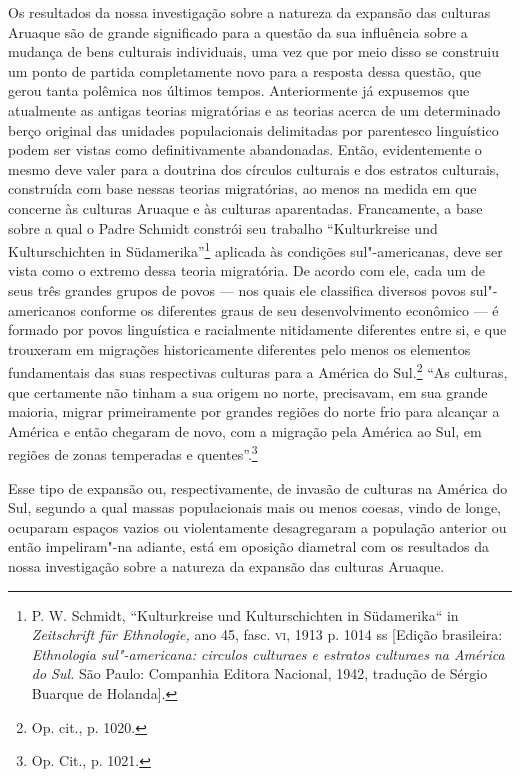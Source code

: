 Os resultados da nossa investigação sobre a natureza da expansão das
culturas Aruaque são de grande significado para a questão da sua
influência sobre a mudança de bens culturais individuais, uma vez que
por meio disso se construiu um ponto de partida completamente novo para
a resposta dessa questão, que gerou tanta polêmica nos últimos tempos.
Anteriormente já expusemos que atualmente as antigas teorias migratórias
e as teorias acerca de um determinado berço original das unidades
populacionais delimitadas por parentesco linguístico podem ser vistas
como definitivamente abandonadas. Então, evidentemente o mesmo deve
valer para a doutrina dos círculos culturais e dos estratos culturais,
construída com base nessas teorias migratórias, ao menos na medida em
que concerne às culturas Aruaque e às culturas aparentadas. Francamente,
a base sobre a qual o Padre Schmidt constrói seu trabalho ``Kulturkreise
und Kulturschichten in Südamerika''\footnote{P. W. Schmidt,
  ``Kulturkreise und Kulturschichten in Südamerika`` in
  \emph{Zeitschrift für Ethnologie,} ano 45, fasc. \textsc{vi}, 1913 p. 1014 ss
  {[}Edição brasileira: \emph{Ethnologia sul"-americana: circulos
  culturaes e estratos culturaes na América do Sul.} São Paulo:
  Companhia Editora Nacional, 1942, tradução de Sérgio Buarque de
  Holanda{]}.} aplicada às condições sul"-americanas, deve ser vista como
o extremo dessa teoria migratória. De acordo com ele, cada um de seus
três grandes grupos de povos --- nos quais ele classifica diversos povos
sul"-americanos conforme os diferentes graus de seu desenvolvimento
econômico --- é formado por povos linguística e racialmente nitidamente
diferentes entre si, e que trouxeram em migrações historicamente
diferentes pelo menos os elementos fundamentais das suas respectivas
culturas para a América do Sul.\footnote{Op. cit., p. 1020.} ``As
culturas, que certamente não tinham a sua origem no norte, precisavam,
em sua grande maioria, migrar primeiramente por grandes regiões do
norte frio para alcançar a América e então chegaram de novo, com a
migração pela América ao Sul, em regiões de zonas temperadas e
quentes''.\footnote{Op. Cit., p. 1021.}

Esse tipo de expansão ou, respectivamente, de invasão de culturas na
América do Sul, segundo a qual massas populacionais mais ou menos
coesas, vindo de longe, ocuparam espaços vazios ou violentamente
desagregaram a população anterior ou então impeliram"-na adiante, está em
oposição diametral com os resultados da nossa investigação sobre a
natureza da expansão das culturas Aruaque.

